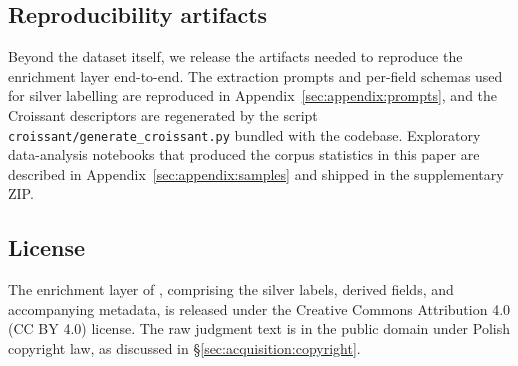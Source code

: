 \subsection{Reproducibility artifacts}
\label{sec:release:repro}

Beyond the dataset itself, we release the artifacts needed to reproduce the enrichment layer end-to-end. The extraction prompts and per-field schemas used for silver labelling are reproduced in Appendix~\ref{sec:appendix:prompts}, and the Croissant descriptors are regenerated by the script \texttt{croissant/generate\_croissant.py} bundled with the codebase. Exploratory data-analysis notebooks that produced the corpus statistics in this paper are described in Appendix~\ref{sec:appendix:samples} and shipped in the supplementary ZIP.

\subsection{License}
\label{sec:release:license}

The enrichment layer of \juddgespl{}, comprising the silver labels, derived fields, and accompanying metadata, is released under the Creative Commons Attribution 4.0 (CC BY 4.0) license. The raw judgment text is in the public domain under Polish copyright law, as discussed in \S\ref{sec:acquisition:copyright}.

